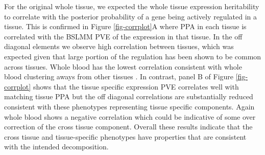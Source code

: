 \documentclass[10pt,letterpaper]{article}
\begin{document}
For the original whole tissue, we expected the whole tissue expression heritability to correlate with the posterior probability of a gene being actively regulated in a tissue. This is confirmed in Figure \ref{fig-corrplot}A where PPA in each tissue is correlated with the BSLMM PVE of the expression in that tissue. In the off diagonal elements we observe high correlation between tissues, which was expected given that large portion of the regulation has been shown to be common across tissues. Whole blood has the lowest correlation  consistent with whole blood clustering aways from other tissues \cite{Ardlie_2015}. In contrast, panel B of Figure \ref{fig-corrplot} shows that the tissue specific expression PVE correlates well with matching tissue PPA but the off diagonal correlations are substantially reduced consistent with these phenotypes representing tissue specific components. Again whole blood shows a negative correlation which could be indicative of some over correction of the cross tissue component. Overall these results indicate that the cross tissue and tissue-specific phenotypes have properties that are consistent with the intended decomposition.


\end{document}
